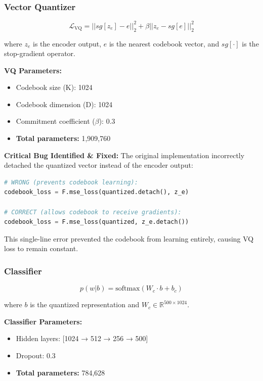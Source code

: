 \documentclass[12pt,a4paper]{article}
\begin{document}
\subsubsection{Vector Quantizer}
\begin{equation}
\mathcal{L}_{\text{VQ}} = ||sg[z_e] - e||_2^2 + \beta ||z_e - sg[e]||_2^2
\end{equation}

\noindent where $z_e$ is the encoder output, $e$ is the nearest codebook vector, and $sg[\cdot]$ is the stop-gradient operator.

\textbf{VQ Parameters:}
\begin{itemize}
    \item Codebook size (K): 1024
    \item Codebook dimension (D): 1024
    \item Commitment coefficient ($\beta$): 0.3
    \item \textbf{Total parameters:} 1,909,760
\end{itemize}

\textbf{Critical Bug Identified \& Fixed:}
The original implementation incorrectly detached the quantized vector instead of the encoder output:

\begin{lstlisting}[language=Python, caption=VQ Bug Fix]
# WRONG (prevents codebook learning):
codebook_loss = F.mse_loss(quantized.detach(), z_e)

# CORRECT (allows codebook to receive gradients):
codebook_loss = F.mse_loss(quantized, z_e.detach())
\end{lstlisting}

This single-line error prevented the codebook from learning entirely, causing VQ loss to remain constant.

\subsubsection{Classifier}
\begin{equation}
p(w | b) = \text{softmax}(W_c \cdot b + b_c)
\end{equation}

\noindent where $b$ is the quantized representation and $W_c \in \mathbb{R}^{500 \times 1024}$.

\textbf{Classifier Parameters:}
\begin{itemize}
    \item Hidden layers: [1024 → 512 → 256 → 500]
    \item Dropout: 0.3
    \item \textbf{Total parameters:} 784,628
\end{itemize}
\end{document}

